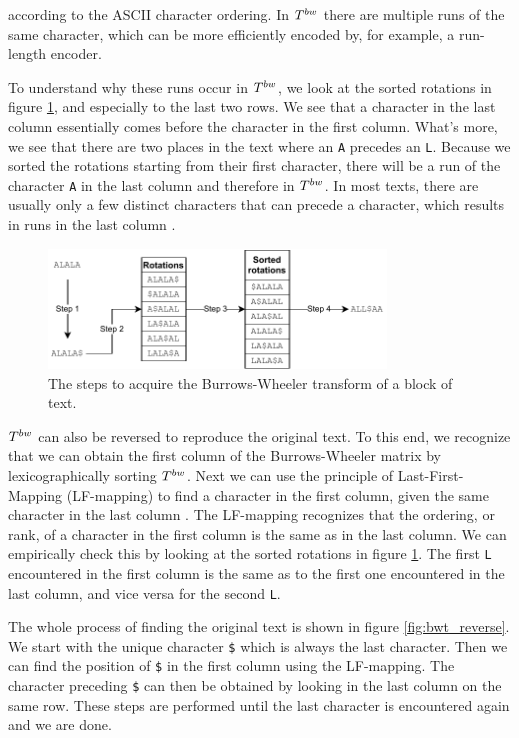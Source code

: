 according to the ASCII character ordering.
In $T^{bw}$ there are multiple runs of the same character, which can be more efficiently encoded by, for example, a run-length encoder.

To understand why these runs occur in $T^{bw}$, we look at the sorted rotations in figure \ref{fig:bwt}, and especially to the last two rows.
We see that a character in the last column essentially comes before the character in the first column.
What's more, we see that there are two places in the text where an \texttt{A} precedes an \texttt{L}.
Because we sorted the rotations starting from their first character, there will be a run of the character \texttt{A} in the last column and therefore in $T^{bw}$.
In most texts, there are usually only a few distinct characters that can precede a character, which results in runs in the last column \cite{burrows_block-sorting_1994}.

\begin{figure}[ht]
\centering
\includegraphics[width=0.8\textwidth]{figures/bwt.pdf}
\caption{The steps to acquire the Burrows-Wheeler transform of a block of text.}
\label{fig:bwt}
\end{figure}

$T^{bw}$ can also be reversed to reproduce the original text.
To this end, we recognize that we can obtain the first column of the Burrows-Wheeler matrix by lexicographically sorting $T^{bw}$.
Next we can use the principle of Last-First-Mapping (LF-mapping) to find a character in the first column, given the same character in the last column \cite{ferragina_opportunistic_2000}.
The LF-mapping recognizes that the ordering, or rank, of a character in the first column is the same as in the last column.
We can empirically check this by looking at the sorted rotations in figure \ref{fig:bwt}.
The first \texttt{L} encountered in the first column is the same as to the first one encountered in the last column, and vice versa for the second \texttt{L}.

The whole process of finding the original text is shown in figure \ref{fig:bwt_reverse}.
We start with the unique character \texttt{\$} which is always the last character.
Then we can find the position of \texttt{\$} in the first column using the LF-mapping.
The character preceding \texttt{\$} can then be obtained by looking in the last column on the same row.
These steps are performed until the last character is encountered again and we are done.


